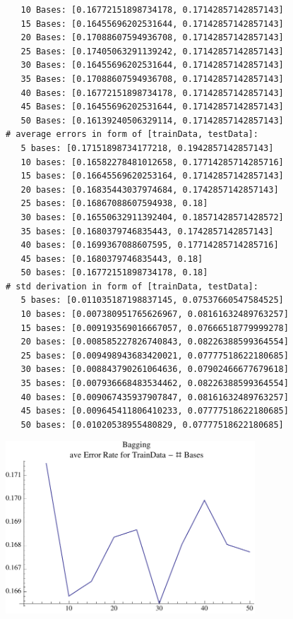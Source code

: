 \documentclass[12pt]{amsart}
\begin{document}
\begin{verbatim}
   10 Bases: [0.16772151898734178, 0.17142857142857143]
   15 Bases: [0.16455696202531644, 0.17142857142857143]
   20 Bases: [0.17088607594936708, 0.17142857142857143]
   25 Bases: [0.17405063291139242, 0.17142857142857143]
   30 Bases: [0.16455696202531644, 0.17142857142857143]
   35 Bases: [0.17088607594936708, 0.17142857142857143]
   40 Bases: [0.16772151898734178, 0.17142857142857143]
   45 Bases: [0.16455696202531644, 0.17142857142857143]
   50 Bases: [0.16139240506329114, 0.17142857142857143]
# average errors in form of [trainData, testData]:
   5 bases: [0.17151898734177218, 0.1942857142857143]
   10 bases: [0.16582278481012658, 0.17714285714285716]
   15 bases: [0.16645569620253164, 0.17142857142857143]
   20 bases: [0.16835443037974684, 0.1742857142857143]
   25 bases: [0.16867088607594938, 0.18]
   30 bases: [0.16550632911392404, 0.18571428571428572]
   35 bases: [0.1680379746835443, 0.1742857142857143]
   40 bases: [0.1699367088607595, 0.17714285714285716]
   45 bases: [0.1680379746835443, 0.18]
   50 bases: [0.16772151898734178, 0.18]
# std derivation in form of [trainData, testData]:
   5 bases: [0.011035187198837145, 0.07537660547584525]
   10 bases: [0.007380951765626967, 0.08161632489763257]
   15 bases: [0.009193569016667057, 0.07666518779999278]
   20 bases: [0.008585227826740843, 0.08226388599364554]
   25 bases: [0.009498943683420021, 0.07777518622180685]
   30 bases: [0.008843790261064636, 0.07902466677679618]
   35 bases: [0.007936668483534462, 0.08226388599364554]
   40 bases: [0.009067435937907847, 0.08161632489763257]
   45 bases: [0.009645411806410233, 0.07777518622180685]
   50 bases: [0.01020538955480829, 0.07777518622180685]

\end{verbatim}
\begin{center}
\includegraphics[width=0.7\textwidth]{aveBGTrain.pdf}
\end{center}
\end{document}
